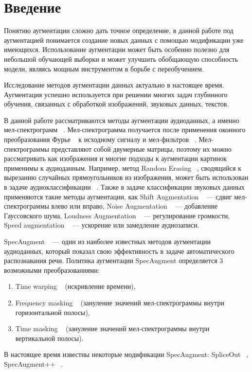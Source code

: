 \documentclass[12pt, fleqn]{article}
\begin{document}
\newpage


\section{Введение}

Понятию аугментации сложно дать точное определение, в данной работе под аугментацией понимается создание новых данных с помощью модификации уже имеющихся. Использование аугментации может быть особенно полезно для небольшой обучающей выборки и может улучшить обобщающую способность модели, являясь мощным инструментом в борьбе с переобучением. 

Исследование методов аугментации данных актуально в настоящее время. Аугментация успешно используется при решении многих задач глубинного обучения, связанных с обработкой изображений, звуковых данных, текстов.

В данной работе рассматриваются методы аугментации аудиоданных, а именно мел-спектрограмм ~\cite{MelSpectrogram}. Мел-спектрограмма получается после применения оконного преобразования Фурье ~\cite{Fourier} к исходному сигналу и мел-фильтров ~\cite{MelScale}. Мел-спектрограммы представляют собой двумерные матрицы, поэтому их можно рассматривать как изображения и многие подходы к аугментации картинок применимы к аудиоданным. Например, метод Random Erasing ~\cite{RandomErasing}, сводящийся к вырезанию случайных прямоугольников из изображения, может быть использован в задаче аудиоклассификации  ~\cite{RandomErasingClassification}. Также в задаче классификации звуковых данных применяются такие методы аугментации, как Shift Augmentation ~\cite{AudioClassification} --- сдвиг мел-спектрограммы влево или вправо, Noise Augmentation ~\cite{AudioClassification} --- добавление Гауссовского шума, Loudness Augmentation ~\cite{AudioClassification} --- регулирование громкости, Speed augmentation ~\cite{AudioClassification} --- ускорение или замедление аудиозаписи.

SpecAugment ~\cite{SpecAugment} --- один из наиболее известных методов аугментации аудиоданных, который показал свою эффективность в задаче автоматического распознавания речи. Политика аугментации SpecAugment определяется 3 возможными преобразованиями: 
\begin{enumerate}
    \item Time warping ~\cite{SpecAugment} (искривление времени),
    \item Frequency masking ~\cite{SpecAugment} (зануление значений мел-спектрограммы внутри горизонтальной полосы),
    \item Time masking ~\cite{SpecAugment} (зануление значений мел-спектрограммы внутри вертикальной полосы).
\end{enumerate}
В настоящее время известны некоторые модификации SpecAugment: SpliceOut ~\cite{SpliceOut}, SpecAugment++ ~\cite{SpecAugment++}.
\end{document}
